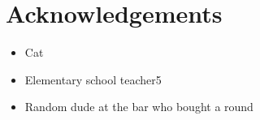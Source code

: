 \documentclass{egpubl}
\begin{document}
\section{Acknowledgements}
\label{sec:acknowledgements}
\begin{itemize}
      \item Cat
      \item Elementary school teacher5
      \item Random dude at the bar who bought a round
\end{itemize}


%


\end{document}
